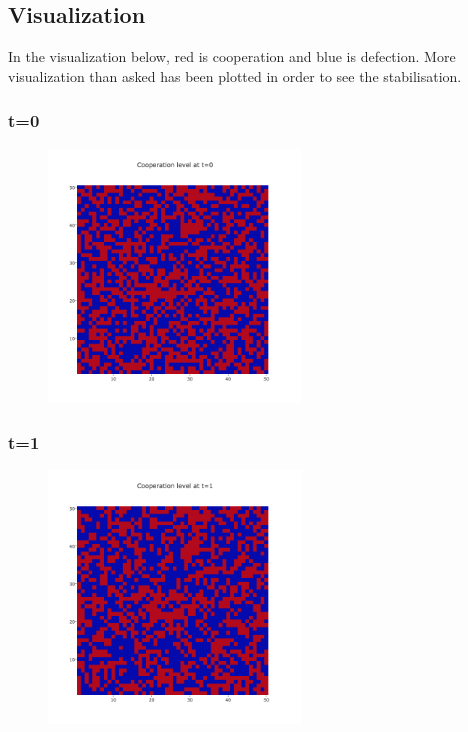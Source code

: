 \documentclass[11pt]{article}
\begin{document}
\subsection{Visualization}

In the visualization below, red is cooperation and blue is defection. More visualization than asked has been plotted in order to see the stabilisation.

\subsubsection{t=0}

\begin{figure}[H]
\centering
   \includegraphics[width=0.6\textwidth]{img/part2/part2-moore-visu-0.png}
\end{figure}

\subsubsection{t=1}

\begin{figure}[H]
\centering
   \includegraphics[width=0.6\textwidth]{img/part2/part2-moore-visu-1.png}
\end{figure}
\end{document}

